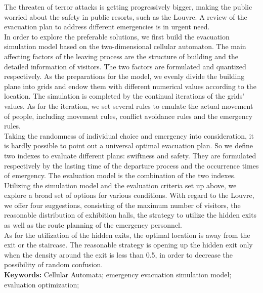 \documentclass{mcmthesis}
\begin{document}

\begin{sheetsummary}
	\indent The threaten of terror attacks is getting progressively bigger, making the public worried about the safety in public resorts, such as the Louvre. A review of the evacuation plan to address different emergencies is in urgent need.  \\
	\indent In order to explore the preferable solutions, we first build the evacuation simulation model based on the two-dimensional cellular automaton. The main affecting factors of the leaving process are the structure of building and the detailed information of visitors. The two factors are formulated and quantized respectively. As the preparations for the model, we evenly divide the  building plane into grids and endow them with different numerical values according to the location.  The simulation is completed by the continual iterations of the grids' values. As for the iteration, we set several rules to emulate the actual movement of people, including movement rules, conflict avoidance rules and the emergency rules.  \\
	\indent Taking the randomness of individual choice and emergency into consideration, it is hardly possible to point out a universal optimal evacuation plan. So we  define two indexes to evaluate different plans: swiftness and safety. They are formulated respectively by the lasting time of the departure process and the occurrence times of emergency. The evaluation model is the combination of the two indexes. \\
	\indent Utilizing the simulation model and the evaluation criteria set up above, we explore a broad set of options for various conditions. With regard to the Louvre, we offer four suggestions, consisting of the maximum number of visitors, the reasonable distribution of exhibition halls, the strategy to utilize the hidden exits as well as the route planning of the emergency personnel. \\
	\indent As for the utilization of the hidden exits, the optimal location is away from the exit or the staircase. The reasonable strategy is opening up the hidden exit only when the density around the exit is less than 0.5, in order to decrease the possibility of random confusion. \\

	\indent \textbf{Keywords:} Cellular Automata; emergency evacuation simulation model; evaluation optimization;
\end{sheetsummary}
\maketitle
\tableofcontents
\newpage
\end{document}
